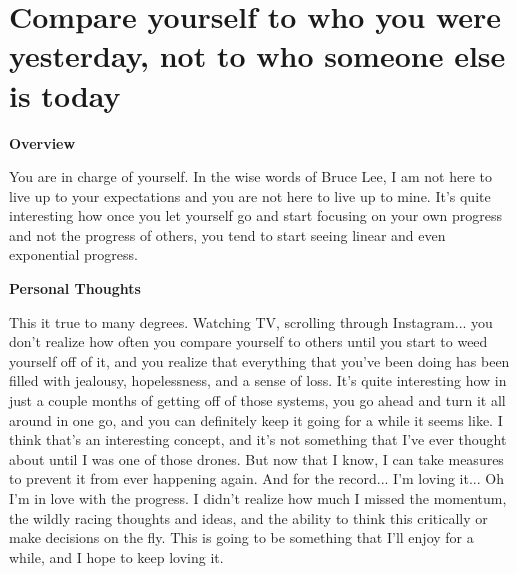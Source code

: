 \documentclass{article}
\begin{document}
\section{Compare yourself to who you were yesterday, not to who someone else is today}
    \begin{multicols}{2}
        \begin{center}
            \textbf{Overview}
        \end{center}
        
        You are in charge of yourself. In the wise words of Bruce Lee, I am not here to live up to your expectations and you are not here to live up to mine. It's quite interesting how once you let yourself go and start focusing on your own progress and not the progress of others, you tend to start seeing linear and even exponential progress. 

        \begin{center}
            \textbf{Personal Thoughts}
        \end{center}
        
        This it true to many degrees. Watching TV, scrolling through Instagram... you don't realize how often you compare yourself to others until you start to weed yourself off of it, and you realize that everything that you've been doing has been filled with jealousy, hopelessness, and a sense of loss. It's quite interesting how in just a couple months of getting off of those systems, you go ahead and turn it all around in one go, and you can definitely keep it going for a while it seems like. I think that's an interesting concept, and it's not something that I've ever thought about until I was one of those drones. But now that I know, I can take measures to prevent it from ever happening again. And for the record... I'm loving it... Oh I'm in love with the progress. I didn't realize how much I missed the momentum, the wildly racing thoughts and ideas, and the ability to think this critically or make decisions on the fly. This is going to be something that I'll enjoy for a while, and I hope to keep loving it.
        
    \end{multicols}
\end{document}
